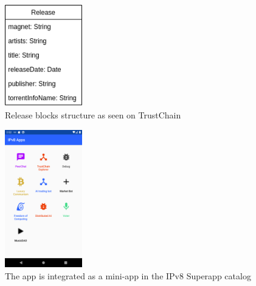 \begin{figure}
    \centering
    \includegraphics[width=0.3\textwidth]{implementation/release-implementation.png}
    \caption{Release blocks structure as seen on TrustChain}
    \label{fig:release-implementation}
\end{figure}
\begin{figure}
    \centering
    \includegraphics[width=0.3\textwidth]{implementation/screenshot-superapp.png}
    \caption{The app is integrated as a mini-app in the IPv8 Superapp catalog}
    \label{fig:screenshot-superapp}
\end{figure}
